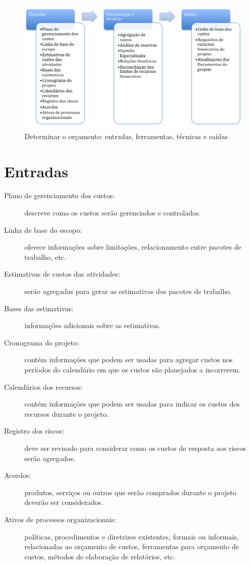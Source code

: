\begin{figure}[!h]
	\centering
	\includegraphics[scale=0.5]{Figuras/custos_efts_orcamento.png}
	\caption{Determinar o orçamento: entradas, ferramentas, técnicas e saídas}
	\label{fig:custos:orcamento:efts}
\end{figure}

\section{Entradas}

\begin{description}

	
	\item[Plano de gerenciamento dos custos:] descreve como os custos serão gerenciados e controlados.

	\item[Linha de base do escopo:] oferece informações sobre limitações, relacionamento entre pacotes de trabalho, etc.
	
	\item[Estimativas de custos das atividades:] serão agregadas para gerar as estimativas dos pacotes de trabalho.
	
	\item[Bases das estimativas:] informações adicionais sobre as estimativas.
	
	\item[Cronograma do projeto:] contém informações que podem ser usadas para agregar custos nos períodos do calendário em que os custos são planejados a incorrerem.
	
	\item[Calendários dos recursos:] contém informações que podem ser usadas para indicar os custos dos recursos durante o projeto.
	
	\item[Registro dos riscos:] deve ser revisado para considerar como os custos de resposta aos riscos serão agregados.
	
	\item[Acordos:] produtos, serviços ou outros que serão comprados durante o projeto deverão ser considerados.
	
	\item[Ativos de processos organizacionais:] políticas, procedimentos e diretrizes existentes, formais ou informais, relacionadas ao orçamento de custos, ferramentas para orçamento de custos, métodos de elaboração de relatórios, etc.
	
\end{description}

